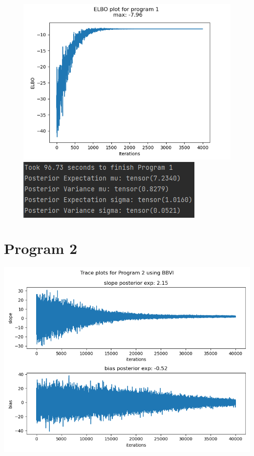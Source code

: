 \documentclass[10pt]{homeworg}
\begin{document}
\begin{figure}
    \centering
    \begin{minipage}{0.45\textwidth}
        \centering
       \includegraphics[scale=0.5]{figures/elbo_program_1.png}
    \end{minipage}\hfill
    \begin{minipage}{0.45\textwidth}
        \centering
        \includegraphics[scale=0.8]{figures/program1_time.png}
    \end{minipage}
\end{figure}

\newpage


\section{Program 2}
\begin{center}
\includegraphics[scale=0.5]{figures/BBVI_program_2.png}
\end{center}
\end{document}
